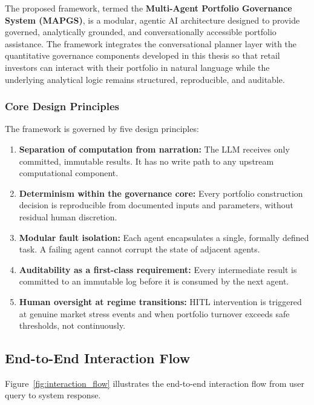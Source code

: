 \documentclass[11pt]{article}
\begin{document}
The proposed framework, termed the \textbf{Multi-Agent Portfolio Governance System (MAPGS)}, is a modular, agentic AI architecture designed to provide governed, analytically grounded, and conversationally accessible portfolio assistance. The framework integrates the conversational planner layer with the quantitative governance components developed in this thesis so that retail investors can interact with their portfolio in natural language while the underlying analytical logic remains structured, reproducible, and auditable.

\subsubsection{Core Design Principles}

The framework is governed by five design principles:

\begin{enumerate}[label=\textbf{DP\arabic*.}]
  \item \textbf{Separation of computation from narration:} The LLM receives only committed, immutable results. It has no write path to any upstream computational component.

  \item \textbf{Determinism within the governance core:} Every portfolio construction decision is reproducible from documented inputs and parameters, without residual human discretion.

  \item \textbf{Modular fault isolation:} Each agent encapsulates a single, formally defined task. A failing agent cannot corrupt the state of adjacent agents.

  \item \textbf{Auditability as a first-class requirement:} Every intermediate result is committed to an immutable log before it is consumed by the next agent.

  \item \textbf{Human oversight at regime transitions:} HITL intervention is triggered at genuine market stress events and when portfolio turnover exceeds safe thresholds, not continuously.
\end{enumerate}

\subsection{End-to-End Interaction Flow}
\label{sec:interaction_flow}

Figure~\ref{fig:interaction_flow} illustrates the end-to-end interaction flow from user query to system response.
\end{document}

